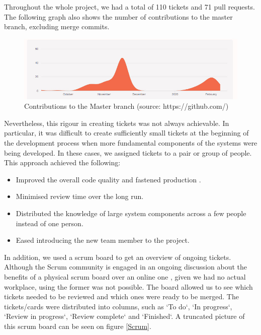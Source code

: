 \documentclass[main.tex]{subfiles}
\begin{document}
Throughout the whole project, we had a total of 110 tickets and 71 pull requests. The following graph also shows the number of contributions to the master branch, excluding merge commits.

\begin{figure}[H]
   \centering
   \includegraphics[width=\textwidth]{05Coding/05Pictures/contributions.jpg}
   \caption{Contributions to the Master branch (source: https://github.com/)}
\end{figure}

Nevertheless, this rigour in creating tickets was not always achievable. In particular, it was difficult to create sufficiently small tickets at the beginning of the development process when more fundamental components of the systems were being developed. In these cases, we assigned tickets to a pair or group of people. This approach achieved the following:

\begin{itemize}
    \item Improved the overall code quality and fastened production \cite{pairprogramming}.
    \item Minimised review time over the long run.
    \item Distributed the knowledge of large system components across a few people instead of one person.
    \item Eased introducing the new team member to the project.
\end{itemize}

In addition, we used a scrum board to get an overview of ongoing tickets. Although the Scrum community is engaged in an ongoing discussion about the benefits of a physical scrum board over an online one \cite{physicalscrum}, given we had no actual workplace, using the former was not possible. The board allowed us to see which tickets needed to be reviewed and which ones were ready to be merged. The tickets/cards were distributed into columns, such as `To do`, `In progress`, `Review in progress`, `Review complete` and `Finished`. A truncated picture of this scrum board can be seen on figure \figurename{\ref{Scrum}}.
\end{document}
